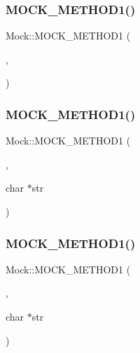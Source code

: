 \mbox{\label{class_mock_ae73b4ee90bf6d84205d2b1c17f0b8433}} 
\subsubsection{\texorpdfstring{MOCK\_METHOD1()}{MOCK\_METHOD1()}\hspace{0.1cm}{\footnotesize\ttfamily [9/27]}}
{\footnotesize\ttfamily Mock\+::\+M\+O\+C\+K\+\_\+\+M\+E\+T\+H\+O\+D1 (\begin{DoxyParamCaption}\item[{\mbox{\hyperlink{class_interface_ab34c8a5fd2236a6b009f86a4e5851b61}{Int\+From\+String}}}]{,  }\item[{int(char $\ast$str)}]{ }\end{DoxyParamCaption})}

\mbox{\label{class_mock_a2cece30a3ea92b34f612f8032fe3a0f9}} 
\subsubsection{\texorpdfstring{MOCK\_METHOD1()}{MOCK\_METHOD1()}\hspace{0.1cm}{\footnotesize\ttfamily [10/27]}}
{\footnotesize\ttfamily Mock\+::\+M\+O\+C\+K\+\_\+\+M\+E\+T\+H\+O\+D1 (\begin{DoxyParamCaption}\item[{\mbox{\hyperlink{class_interface_ab93276de67e60c44fd775d4c139aa8e1}{Int\+Ref\+From\+String}}}]{,  }\item[{int \&}]{char $\ast$str }\end{DoxyParamCaption})}

\mbox{\label{class_mock_a2cece30a3ea92b34f612f8032fe3a0f9}} 
\subsubsection{\texorpdfstring{MOCK\_METHOD1()}{MOCK\_METHOD1()}\hspace{0.1cm}{\footnotesize\ttfamily [11/27]}}
{\footnotesize\ttfamily Mock\+::\+M\+O\+C\+K\+\_\+\+M\+E\+T\+H\+O\+D1 (\begin{DoxyParamCaption}\item[{\mbox{\hyperlink{class_interface_ab93276de67e60c44fd775d4c139aa8e1}{Int\+Ref\+From\+String}}}]{,  }\item[{int \&}]{char $\ast$str }\end{DoxyParamCaption})}

